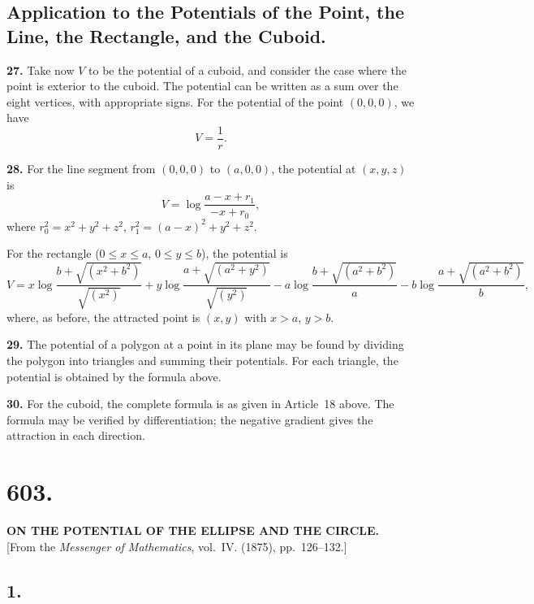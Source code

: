 \documentclass[11pt,a4paper]{book}
\begin{document}
\subsection*{Application to the Potentials of the Point, the Line, the Rectangle, and the Cuboid.}

\smallskip\noindent\textbf{27.}\quad
Take now $V$ to be the potential of a cuboid, and consider the case where
the point is exterior to the cuboid. The potential can be written as a sum
over the eight vertices, with appropriate signs. For the potential of the
point $(0,0,0)$, we have
\[
V = \frac{1}{r}.
\]

\smallskip\noindent\textbf{28.}\quad
For the line segment from $(0,0,0)$ to $(a,0,0)$, the potential at $(x,y,z)$
is
\[
V = \log\frac{a-x+r_1}{-x+r_0},
\]
where $r_0^2=x^2+y^2+z^2$, $r_1^2=(a-x)^2+y^2+z^2$.

\newpage
\noindent For the rectangle ($0\leq x\leq a$, $0\leq y\leq b$), the potential is
\[
V = x\log\frac{b+\sqrt{(x^2+b^2)}}{\sqrt{(x^2)}}
  + y\log\frac{a+\sqrt{(a^2+y^2)}}{\sqrt{(y^2)}}
  - a\log\frac{b+\sqrt{(a^2+b^2)}}{a}
  - b\log\frac{a+\sqrt{(a^2+b^2)}}{b},
\]
where, as before, the attracted point is $(x,y)$ with $x>a$, $y>b$.

\smallskip\noindent\textbf{29.}\quad
The potential of a polygon at a point in its plane may be found by dividing
the polygon into triangles and summing their potentials. For each triangle,
the potential is obtained by the formula above.

\smallskip\noindent\textbf{30.}\quad
For the cuboid, the complete formula is as given in Article~18 above. The
formula may be verified by differentiation; the negative gradient gives the
attraction in each direction.

\newpage
\section*{603.}
\begin{center}
{\large\bfseries ON THE POTENTIAL OF THE ELLIPSE AND THE CIRCLE.}\\[0.5em]
[From the \textit{Messenger of Mathematics}, vol.~IV. (1875), pp.~126--132.]
\end{center}

\subsection*{1.}
\end{document}
